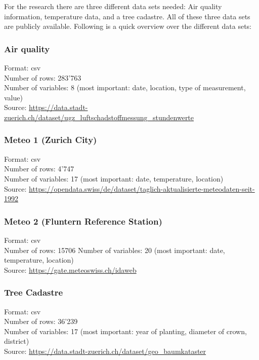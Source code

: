 \documentclass[
]{article}
\begin{document}
For the research there are three different data sets needed: Air quality
information, temperature data, and a tree cadastre. All of these three
data sets are publicly available. Following is a quick overview over the
different data sets:

\hypertarget{air-quality}{%
\subsubsection{Air quality}\label{air-quality}}

Format: csv\\
Number of rows: 283'763\\
Number of variables: 8 (most important: date, location, type of
measurement, value)\\
Source:
\url{https://data.stadt-zuerich.ch/dataset/ugz_luftschadstoffmessung_stundenwerte}

\hypertarget{meteo-1-zurich-city}{%
\subsubsection{Meteo 1 (Zurich City)}\label{meteo-1-zurich-city}}

Format: csv\\
Number of rows: 4'747\\
Number of variables: 17 (most important: date, temperature, location)\\
Source:
\url{https://opendata.swiss/de/dataset/taglich-aktualisierte-meteodaten-seit-1992}

\hypertarget{meteo-2-fluntern-reference-station}{%
\subsubsection{Meteo 2 (Fluntern Reference
Station)}\label{meteo-2-fluntern-reference-station}}

Format: csv\\
Number of rows: 15706 Number of variables: 20 (most important: date,
temperature, location)\\
Source: \url{https://gate.meteoswiss.ch/idaweb}

\hypertarget{tree-cadastre}{%
\subsubsection{Tree Cadastre}\label{tree-cadastre}}

Format: csv\\
Number of rows: 36'239\\
Number of variables: 17 (most important: year of planting, diameter of
crown, district)\\
Source: \url{https://data.stadt-zuerich.ch/dataset/geo_baumkataster}
\end{document}
